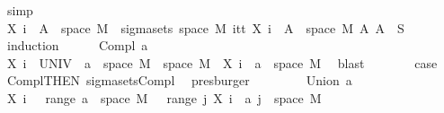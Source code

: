 \begin{isabellebody}
\ simp\isanewline
\ \ \isamarkupfalse%
\ {\isachardoublequoteopen}X\ i\ {\isacharminus}{\kern0pt}{\isacharbackquote}{\kern0pt}\ A\ {\isasyminter}\ space\ M\ {\isasymin}\ sigma{\isacharunderscore}{\kern0pt}sets\ {\isacharparenleft}{\kern0pt}space\ M{\isacharparenright}{\kern0pt}\ {\isacharparenleft}{\kern0pt}{\isasymUnion}i{\isasymin}{\isacharbraceleft}{\kern0pt}tt{\isacharbraceright}{\kern0pt}{\isachardot}{\kern0pt}\ {\isacharbraceleft}{\kern0pt}X\ i\ {\isacharminus}{\kern0pt}{\isacharbackquote}{\kern0pt}\ A\ {\isasyminter}\ space\ M\ {\isacharbar}{\kern0pt}A{\isachardot}{\kern0pt}\ A\ {\isasymin}\ S{\isacharbraceright}{\kern0pt}{\isacharparenright}{\kern0pt}{\isachardoublequoteclose}\isanewline
\ \ \isamarkupfalse%
\ {\isacharparenleft}{\kern0pt}induction{\isacharparenright}{\kern0pt}\isanewline
\ \ \ \ \isamarkupfalse%
\ {\isacharparenleft}{\kern0pt}Compl\ a{\isacharparenright}{\kern0pt}\isanewline
\ \ \ \ \isamarkupfalse%
\ {\isachardoublequoteopen}X\ i\ {\isacharminus}{\kern0pt}{\isacharbackquote}{\kern0pt}\ {\isacharparenleft}{\kern0pt}UNIV\ {\isacharminus}{\kern0pt}\ a{\isacharparenright}{\kern0pt}\ {\isasyminter}\ space\ M\ {\isacharequal}{\kern0pt}\ space\ M\ {\isacharminus}{\kern0pt}\ {\isacharparenleft}{\kern0pt}X\ i\ {\isacharminus}{\kern0pt}{\isacharbackquote}{\kern0pt}\ a\ {\isasyminter}\ space\ M{\isacharparenright}{\kern0pt}{\isachardoublequoteclose}\ \isamarkupfalse%
\ blast\isanewline
\ \ \ \ \isamarkupfalse%
\ \isamarkupfalse%
\ {\isacharquery}{\kern0pt}case\ \isamarkupfalse%
\ Compl{\isacharparenleft}{\kern0pt}{}{\isacharparenright}{\kern0pt}{\isacharbrackleft}{\kern0pt}THEN\ sigma{\isacharunderscore}{\kern0pt}sets{\isachardot}{\kern0pt}Compl{\isacharbrackright}{\kern0pt}\ \isamarkupfalse%
\ presburger\isanewline
\ \ \isamarkupfalse%
\isanewline
\ \ \ \ \isamarkupfalse%
\ {\isacharparenleft}{\kern0pt}Union\ a{\isacharparenright}{\kern0pt}\isanewline
\ \ \ \ \isamarkupfalse%
\ {\isachardoublequoteopen}X\ i\ {\isacharminus}{\kern0pt}{\isacharbackquote}{\kern0pt}\ {\isasymUnion}\ {\isacharparenleft}{\kern0pt}range\ a{\isacharparenright}{\kern0pt}\ {\isasyminter}\ space\ M\ {\isacharequal}{\kern0pt}\ {\isasymUnion}\ {\isacharparenleft}{\kern0pt}range\ {\isacharparenleft}{\kern0pt}{\isasymlambda}j{\isachardot}{\kern0pt}\ X\ i\ {\isacharminus}{\kern0pt}{\isacharbackquote}{\kern0pt}\ a\ j\ {\isasyminter}\ space\ M{\isacharparenright}{\kern0pt}{\isacharparenright}{\kern0pt}{\isachardoublequoteclose}\ \isamarkupfalse%

\end{isabellebody}
